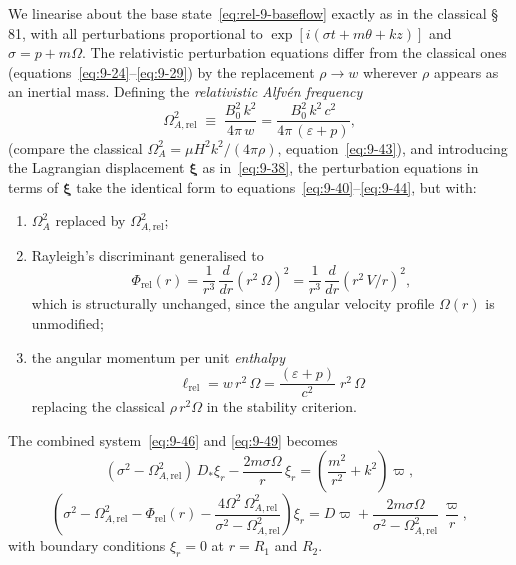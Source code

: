 We linearise about the base state~\eqref{eq:rel-9-baseflow} exactly as
in the classical \S\,81, with all perturbations proportional to
$\exp[i(\sigma t + m\theta + kz)]$ and $\sigma = p + m\Omega$.
The relativistic perturbation equations differ from the classical ones
(equations~\eqref{eq:9-24}--\eqref{eq:9-29}) by the replacement
$\rho \to w$ wherever $\rho$ appears as an inertial mass.  Defining
the \emph{relativistic Alfv\'en frequency}
\begin{equation}
  \Omega_{A,\mathrm{rel}}^{2}
  \;\equiv\; \frac{B_{0}^{2}\,k^{2}}{4\pi\,w}
  = \frac{B_{0}^{2}\,k^{2}\,c^{2}}{4\pi\,(\varepsilon + p)},
  \label{eq:rel-9-OmegaA}
\end{equation}
(compare the classical $\Omega_{A}^{2} = \mu H^{2}k^{2}/(4\pi\rho)$,
equation~\eqref{eq:9-43}), and introducing the Lagrangian displacement
$\boldsymbol{\xi}$ as in~\eqref{eq:9-38}, the perturbation equations
in terms of $\boldsymbol{\xi}$ take the identical form to
equations~\eqref{eq:9-40}--\eqref{eq:9-44}, but with:
\begin{enumerate}
\item $\Omega_{A}^{2}$ replaced by $\Omega_{A,\mathrm{rel}}^{2}$;
\item Rayleigh's discriminant generalised to
\begin{equation}
  \Phi_{\mathrm{rel}}(r)
  = \frac{1}{r^{3}}\,\frac{d}{dr}\!\left(r^{2}\,\Omega\right)^{2}
  = \frac{1}{r^{3}}\,\frac{d}{dr}\!\left(r^{2}\,V/r\right)^{2},
  \label{eq:rel-9-Phi}
\end{equation}
which is structurally unchanged, since the angular velocity profile
$\Omega(r)$ is unmodified;
\item the angular momentum per unit \emph{enthalpy}
\begin{equation}
  \ell_{\mathrm{rel}} = w\,r^{2}\,\Omega
  = \frac{(\varepsilon + p)}{c^{2}}\;r^{2}\,\Omega
  \label{eq:rel-9-angmom}
\end{equation}
replacing the classical $\rho\, r^{2}\Omega$ in the stability
criterion.
\end{enumerate}

The combined system~\eqref{eq:9-46} and \eqref{eq:9-49} becomes
\begin{equation}
  (\sigma^{2} - \Omega_{A,\mathrm{rel}}^{2})\,D_{*}\xi_{r}
  - \frac{2m\sigma\Omega}{r}\,\xi_{r}
  = \left(\frac{m^{2}}{r^{2}} + k^{2}\right)\varpi,
  \label{eq:rel-9-46}
\end{equation}
\begin{equation}
  \left(\sigma^{2} - \Omega_{A,\mathrm{rel}}^{2}
    - \Phi_{\mathrm{rel}}(r)
    - \frac{4\Omega^{2}\,\Omega_{A,\mathrm{rel}}^{2}}
           {\sigma^{2} - \Omega_{A,\mathrm{rel}}^{2}}\right)\xi_{r}
  = D\varpi
    + \frac{2m\sigma\Omega}{\sigma^{2} - \Omega_{A,\mathrm{rel}}^{2}}
      \,\frac{\varpi}{r},
  \label{eq:rel-9-49}
\end{equation}
with boundary conditions $\xi_{r}=0$ at $r=R_{1}$ and $R_{2}$.

